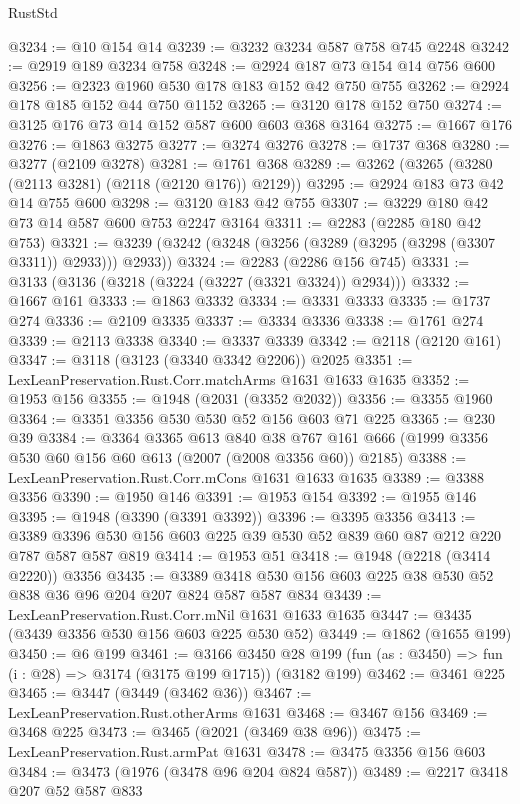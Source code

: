 \begin{lexlean}{RustStd}
\begin{coremodule}
@3234 := @10 @154 @14
@3239 := @3232 @3234 @587 @758 @745 @2248
@3242 := @2919 @189 @3234 @758
@3248 := @2924 @187 @73 @154 @14 @756 @600
@3256 := @2323 @1960 @530 @178 @183 @152 @42 @750 @755
@3262 := @2924 @178 @185 @152 @44 @750 @1152
@3265 := @3120 @178 @152 @750
@3274 := @3125 @176 @73 @14 @152 @587 @600 @603 @368 @3164
@3275 := @1667 @176
@3276 := @1863 @3275
@3277 := @3274 @3276
@3278 := @1737 @368
@3280 := @3277 (@2109 @3278)
@3281 := @1761 @368
@3289 := @3262 (@3265 (@3280 (@2113 @3281) (@2118 (@2120 @176)) @2129))
@3295 := @2924 @183 @73 @42 @14 @755 @600
@3298 := @3120 @183 @42 @755
@3307 := @3229 @180 @42 @73 @14 @587 @600 @753 @2247 @3164
@3311 := @2283 (@2285 @180 @42 @753)
@3321 := @3239 (@3242 (@3248 (@3256 (@3289 (@3295 (@3298 (@3307 @3311)) @2933))) @2933))
@3324 := @2283 (@2286 @156 @745)
@3331 := @3133 (@3136 (@3218 (@3224 (@3227 (@3321 @3324)) @2934)))
@3332 := @1667 @161
@3333 := @1863 @3332
@3334 := @3331 @3333
@3335 := @1737 @274
@3336 := @2109 @3335
@3337 := @3334 @3336
@3338 := @1761 @274
@3339 := @2113 @3338
@3340 := @3337 @3339
@3342 := @2118 (@2120 @161)
@3347 := @3118 (@3123 (@3340 @3342 @2206)) @2025
@3351 := LexLeanPreservation.Rust.Corr.matchArms @1631 @1633 @1635
@3352 := @1953 @156
@3355 := @1948 (@2031 (@3352 @2032))
@3356 := @3355 @1960
@3364 := @3351 @3356 @530 @530 @52 @156 @603 @71 @225
@3365 := @230 @39
@3384 := @3364
    @3365
    @613
    @840
    @38
    @767
    @161
    @666
    (@1999 @3356 @530 @60 @156 @60 @613 (@2007 (@2008 @3356 @60)) @2185)
@3388 := LexLeanPreservation.Rust.Corr.mCons @1631 @1633 @1635
@3389 := @3388 @3356
@3390 := @1950 @146
@3391 := @1953 @154
@3392 := @1955 @146
@3395 := @1948 (@3390 (@3391 @3392))
@3396 := @3395 @3356
@3413 := @3389 @3396 @530 @156 @603 @225 @39 @530 @52 @839 @60 @87 @212 @220 @787 @587 @587 @819
@3414 := @1953 @51
@3418 := @1948 (@2218 (@3414 @2220)) @3356
@3435 := @3389 @3418 @530 @156 @603 @225 @38 @530 @52 @838 @36 @96 @204 @207 @824 @587 @587 @834
@3439 := LexLeanPreservation.Rust.Corr.mNil @1631 @1633 @1635
@3447 := @3435 (@3439 @3356 @530 @156 @603 @225 @530 @52)
@3449 := @1862 (@1655 @199)
@3450 := @6 @199
@3461 := @3166
    @3450
    @28
    @199
    (fun (as : @3450) => fun (i : @28) => @3174 (@3175 @199 @1715))
    (@3182 @199)
@3462 := @3461 @225
@3465 := @3447 (@3449 (@3462 @36))
@3467 := LexLeanPreservation.Rust.otherArms @1631
@3468 := @3467 @156
@3469 := @3468 @225
@3473 := @3465 (@2021 (@3469 @38 @96))
@3475 := LexLeanPreservation.Rust.armPat @1631
@3478 := @3475 @3356 @156 @603
@3484 := @3473 (@1976 (@3478 @96 @204 @824 @587))
@3489 := @2217 @3418 @207 @52 @587 @833

\end{coremodule}
\end{lexlean}
